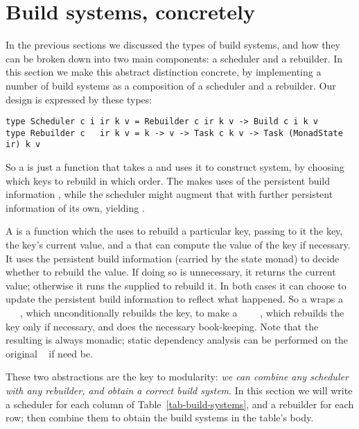 \section{Build systems, concretely}\label{sec-implementations}

In the previous sections we discussed the types of build systems, and how they
can be broken down into two main components: a scheduler and a rebuilder.
In this section we make this abstract distinction concrete, by
implementing a number of build systems as a composition of a scheduler
and a rebuilder.  Our design is expressed by these types:
\begin{verbatim}
type Scheduler c i ir k v = Rebuilder c ir k v -> Build c i k v
type Rebuilder c   ir k v = k -> v -> Task c k v -> Task (MonadState ir) k v
\end{verbatim}
So a  is just a function that takes a  and uses
it to construct  system, by choosing which keys to rebuild in which order.
The  makes uses of the persistent build information , while
the scheduler might augment that with further persistent information of its own,
yielding .

A  is a function which the  uses to rebuild a
particular key, passing to it the key, the key's current value, and a 
that can compute the value of the key if necessary. It uses the persistent build
information  (carried by the state monad) to decide whether to rebuild
the value. If doing so is unnecessary, it returns the current value; otherwise
it runs the supplied  to rebuild it. In both cases it can choose to
update the persistent build information  to reflect what happened. So a
 wraps a ~~~, which unconditionally
rebuilds the key, to make a ~~~~,
which rebuilds the key only if necessary, and does the necessary book-keeping.
Note that the resulting  is always monadic; static dependency analysis
can be performed on the original ~ if need be.

These two abstractions are the key to modularity: \emph{we can combine any
scheduler with any rebuilder, and obtain a correct build system}.
In this section we will write a scheduler for each column of
Table~\ref{tab-build-systems}, and a rebuilder for each row; then combine them
to obtain the build systems in the table's body.


